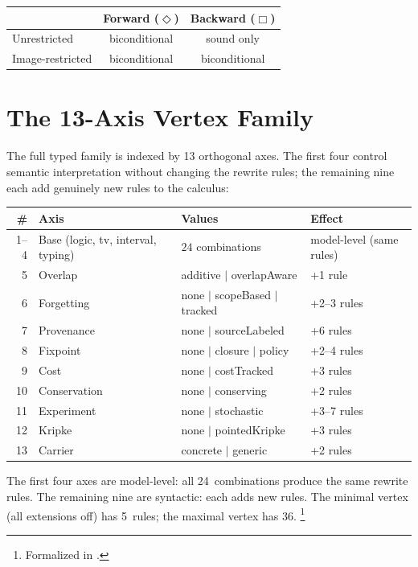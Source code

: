 \documentclass[11pt,openany]{report}
\begin{document}
\begin{center}
\begin{tabular}{lcc}
\toprule
& Forward ($\Diamond$) & Backward ($\Box$) \\
\midrule
Unrestricted & biconditional & sound only \\
Image-restricted & biconditional & biconditional \\
\bottomrule
\end{tabular}
\end{center}


\section{The 13-Axis Vertex Family}
\label{sec:wm-13axis}

The full typed family is indexed by 13 orthogonal axes.  The first
four control semantic interpretation without changing the rewrite
rules; the remaining nine each add genuinely new rules to the
calculus:

\begin{center}
{\footnotesize
\begin{tabular}{rlll}
\toprule
\textbf{\#} & \textbf{Axis} & \textbf{Values} & \textbf{Effect} \\
\midrule
1--4 & Base (logic, tv, interval, typing)
     & $24$ combinations & model-level (same rules) \\
5 & Overlap & additive $|$ overlapAware & +1 rule \\
6 & Forgetting & none $|$ scopeBased $|$ tracked & +2--3 rules \\
7 & Provenance & none $|$ sourceLabeled & +6 rules \\
8 & Fixpoint & none $|$ closure $|$ policy & +2--4 rules \\
9 & Cost & none $|$ costTracked & +3 rules \\
10 & Conservation & none $|$ conserving & +2 rules \\
11 & Experiment & none $|$ stochastic & +3--7 rules \\
12 & Kripke & none $|$ pointedKripke & +3 rules \\
13 & Carrier & concrete $|$ generic & +2 rules \\
\bottomrule
\end{tabular}}
\end{center}

\noindent
The first four axes are model-level: all 24~combinations produce the
same rewrite rules.  The remaining nine are syntactic: each adds new
rules.  The minimal vertex (all extensions off) has 5~rules; the
maximal vertex has 36.%
\footnote{Formalized in
.}
\end{document}
